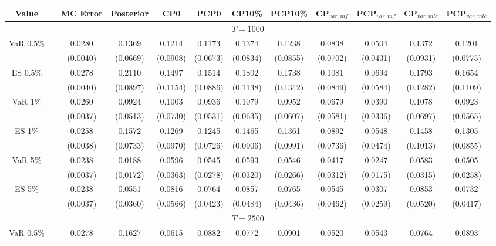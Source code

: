 { \tiny 
{ \renewcommand{\arraystretch}{1.1} 
\begin{sidewaystable} 
\center 
\begin{tabular}{cc cc | cccc | cccc} 
Value && MC Error & Posterior & CP0  & PCP0 & CP10\%  & PCP10\% &CP$_{var,mf}$ & PCP$_{var,mf}$ & CP$_{var,mle}$ & PCP$_{var,mle }$\\ \hline 
\hline 
\multicolumn{12}{c}{$T =1000$}  \\ 
\hline 
\rowcolor{LightCyan} 
VaR 0.5\% && 0.0280 & 0.1369 & 0.1214 & 0.1173 & 0.1374 & 0.1238 &0.0838 & 0.0504 & 0.1372 & 0.1201 \\ 
  && (0.0040) & (0.0669) & (0.0908) & (0.0673) & (0.0834) & (0.0855) &(0.0702) & (0.0431) & (0.0931) & (0.0775) \\ 
\rowcolor{LightCyan} 
ES 0.5\% && 0.0278 & 0.2110 & 0.1497 & 0.1514 & 0.1802 & 0.1738 &0.1081 & 0.0694 & 0.1793 & 0.1654 \\ 
  && (0.0040) & (0.0897) & (0.1154) & (0.0886) & (0.1138) & (0.1342) &(0.0849) & (0.0584) & (0.1282) & (0.1109) \\ [1ex] 
\rowcolor{LightCyan} 
VaR 1\% && 0.0260 & 0.0924 & 0.1003 & 0.0936 & 0.1079 & 0.0952 &0.0679 & 0.0390 & 0.1078 & 0.0923 \\   
 && (0.0037) & (0.0513) & (0.0730) & (0.0531) & (0.0635) & (0.0607) &(0.0581) & (0.0336) & (0.0697) & (0.0565) \\  
\rowcolor{LightCyan} 
ES 1\% && 0.0258 & 0.1572 & 0.1269 & 0.1245 & 0.1465 & 0.1361 &0.0892 & 0.0548 & 0.1458 & 0.1305 \\ 
  && (0.0038) & (0.0733) & (0.0970) & (0.0726) & (0.0906) & (0.0991) &(0.0736) & (0.0474) & (0.1013) & (0.0855) \\ [1ex]
\rowcolor{LightCyan} 
VaR 5\% && 0.0238 & 0.0188 & 0.0596 & 0.0545 & 0.0593 & 0.0546 &0.0417 & 0.0247 & 0.0583 & 0.0505 \\ 
  && (0.0037) & (0.0172) & (0.0363) & (0.0278) & (0.0320) & (0.0266) &(0.0312) & (0.0175) & (0.0315) & (0.0258) \\ 
\rowcolor{LightCyan} 
ES 5\% && 0.0238 & 0.0551 & 0.0816 & 0.0764 & 0.0857 & 0.0765 &0.0545 & 0.0307 & 0.0853 & 0.0732 \\ 
 && (0.0037) & (0.0360) & (0.0566) & (0.0423) & (0.0484) & (0.0436) &(0.0462) & (0.0259) & (0.0520) & (0.0417) \\ 
\hline 
\multicolumn{12}{c}{$T =2500$}  \\ 
\hline 
\rowcolor{LightCyan} 
VaR 0.5\% && 0.0278 & 0.1627 & 0.0615 & 0.0882 & 0.0772 & 0.0901 &0.0520 & 0.0543 & 0.0764 & 0.0893 \\ 

\end{tabular}
\end{sidewaystable}}}
